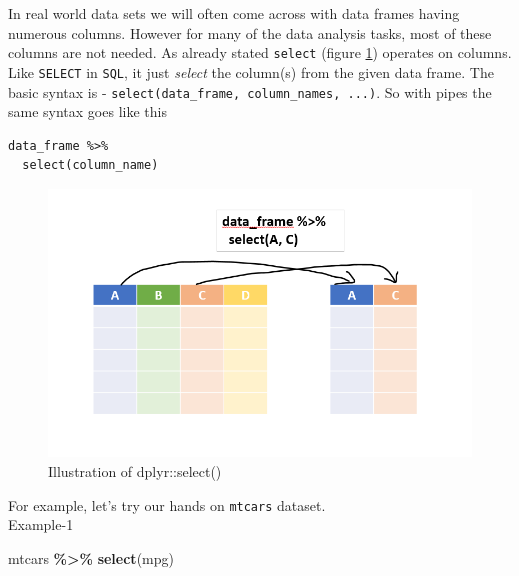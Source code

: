 \documentclass[
]{book}
\newenvironment{Shaded}{\begin{snugshade}}{\end{snugshade}}
\newcommand{\FunctionTok}[1]{\textcolor[rgb]{0.13,0.29,0.53}{\textbf{#1}}}
\newcommand{\NormalTok}[1]{#1}
\newcommand{\SpecialCharTok}[1]{\textcolor[rgb]{0.81,0.36,0.00}{\textbf{#1}}}
\begin{document}
In real world data sets we will often come across with data frames having numerous columns. However for many of the data analysis tasks, most of these columns are not needed. As already stated \texttt{select} (figure \ref{fig:selectr}) operates on columns. Like \texttt{SELECT} in \texttt{SQL}, it just \emph{select} the column(s) from the given data frame. The basic syntax is - \texttt{select(data\_frame,\ column\_names,\ ...)}. So with pipes the same syntax goes like this

\begin{verbatim}
data_frame %>% 
  select(column_name)
\end{verbatim}

\begin{figure}

{\centering \includegraphics[width=0.99\linewidth]{images/select_dplyr} 

}

\caption{Illustration of dplyr::select()}\label{fig:selectr}
\end{figure}

For example, let's try our hands on \texttt{mtcars} dataset.\\
Example-1

\begin{Shaded}
\begin{Highlighting}[]
\NormalTok{mtcars }\SpecialCharTok{\%\textgreater{}\%} 
  \FunctionTok{select}\NormalTok{(mpg)}
\end{Highlighting}
\end{Shaded}
\end{document}
